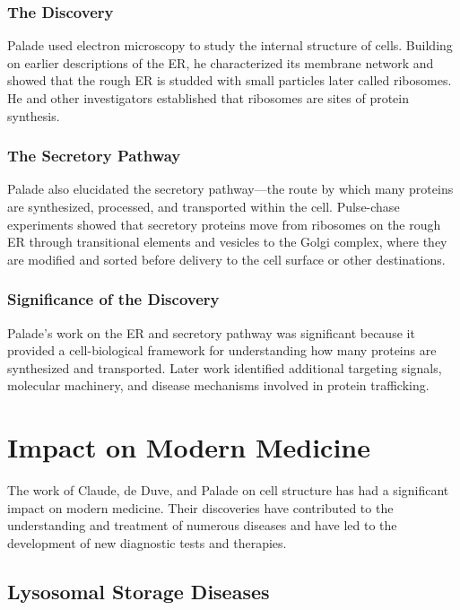 \subsubsection{The Discovery}

Palade used electron microscopy to study the internal structure of cells. Building on earlier descriptions of the ER, he characterized its membrane network and showed that the rough ER is studded with small particles later called ribosomes. He and other investigators established that ribosomes are sites of protein synthesis.

\subsubsection{The Secretory Pathway}

Palade also elucidated the secretory pathway---the route by which many proteins are synthesized, processed, and transported within the cell. Pulse-chase experiments showed that secretory proteins move from ribosomes on the rough ER through transitional elements and vesicles to the Golgi complex, where they are modified and sorted before delivery to the cell surface or other destinations.

\subsubsection{Significance of the Discovery}

Palade's work on the ER and secretory pathway was significant because it provided a cell-biological framework for understanding how many proteins are synthesized and transported. Later work identified additional targeting signals, molecular machinery, and disease mechanisms involved in protein trafficking.

\section{Impact on Modern Medicine}

The work of Claude, de Duve, and Palade on cell structure has had a significant impact on modern medicine. Their discoveries have contributed to the understanding and treatment of numerous diseases and have led to the development of new diagnostic tests and therapies.

\subsection{Lysosomal Storage Diseases}

